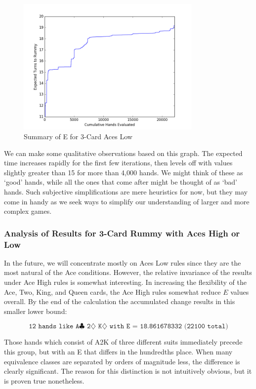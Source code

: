\documentclass[letter,12pt]{article}
\begin{document}
\begin{figure}
\centering
\includegraphics[width=0.8\textwidth]{fig1.png}
\caption{Summary of E for 3-Card Aces Low}\label{fig:1}
\end{figure}

We can make some qualitative observations based on this graph. The expected time increases rapidly for the first few iterations, then levels off with values slightly greater than 15 for more than 4,000 hands. We might think of these as ‘good’ hands, while all the ones that come after might be thought of as ‘bad’ hands. Such subjective simplifications are mere heuristics for now, but they may come in handy as we seek ways to simplify our understanding of larger and more complex games. 

\subsubsection{Analysis of Results for 3-Card Rummy with Aces High or Low}

In the future, we will concentrate mostly on Aces Low rules since they are the most natural of the Ace conditions. However, the relative invariance of the results under Ace High rules is somewhat interesting. In increasing the flexibility of the Ace, Two, King, and Queen cards, the Ace High rules somewhat reduce $E$ values overall. By the end of the calculation the accumulated change results in this smaller lower bound:

$$\texttt{12 hands like A$\clubsuit$ 2$\diamondsuit$ K$\diamondsuit$ with E = 18.861678332 (22100 total)}$$

Those hands which consist of A2K of three different suits immediately precede this group, but with an E that differs in the hundredths place. When many equivalence classes are separated by orders of magnitude less, the difference is clearly significant. The reason for this distinction is not intuitively obvious, but it is proven true nonetheless. 
\end{document}
